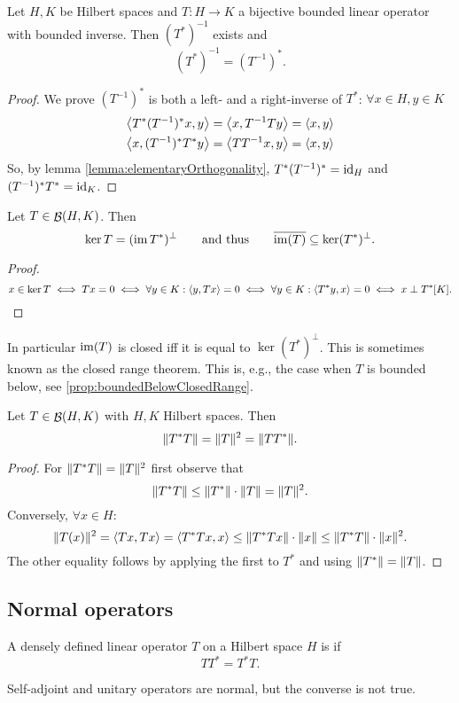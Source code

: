 \begin{proposition}
Let $H,K$ be Hilbert spaces and $T:H\to K$ a bijective bounded linear operator with bounded inverse. Then $(T^*)^{-1}$ exists and
\[ (T^*)^{-1} = (T^{-1})^*. \]
\end{proposition}
\begin{proof}
We prove $(T^{-1})^*$ is both a left- and a right-inverse of $T^*$: $\forall x\in H, y\in K$
\begin{align*}
\left\langle T^*(T^{-1})^*x,y \right\rangle &= \left\langle x,T^{-1}Ty \right\rangle = \left\langle x,y \right\rangle \\
\left\langle x,(T^{-1})^*T^*y \right\rangle &= \left\langle TT^{-1}x,y \right\rangle = \left\langle x,y \right\rangle
\end{align*}
So, by lemma \ref{lemma:elementaryOrthogonality}, $T^*(T^{-1})^* = \operatorname{id}_H$ and $(T^{-1})^*T^* = \operatorname{id}_K$.
\end{proof}

\begin{proposition}
Let $T\in\mathop{\mathcal{B}}(H,K)$. Then
\[ \ker T = (\operatorname{im} T^*)^\perp \qquad \text{and thus} \qquad \overline{\operatorname{im}(T)} \subseteq \ker(T^*)^\perp. \]
\end{proposition}
\begin{proof}
\[ x\in \ker T \iff Tx = 0 \iff \forall y\in K: \left\langle y, Tx \right\rangle=0 \iff \forall y\in K: \left\langle T^*y, x \right\rangle=0 \iff x\perp T^*[K]. \]
\end{proof}
In particular $\operatorname{im}(T)$ is closed iff it is equal to $\ker(T^*)^\perp$. This is sometimes known as the closed range theorem. This is, e.g., the case when $T$ is bounded below, see \ref{prop:boundedBelowClosedRange}.

\begin{proposition} \label{prop:normOfSquare}
Let $T\in \mathop{\mathcal{B}}(H,K)$ with $H,K$ Hilbert spaces. Then
\[ \lVert T^*T\rVert= \lVert T\rVert^2 = \lVert TT^*\rVert. \]
\end{proposition}
\begin{proof}
For $\lVert T^*T\rVert= \lVert T\rVert^2$ first observe that
\[ \lVert T^*T\rVert \leq \lVert T^*\rVert\cdot\lVert T\rVert = \lVert T\rVert^2. \]
Conversely, $\forall x\in H$:
\[ \lVert T(x)\rVert^2 = \left\langle Tx,Tx \right\rangle = \left\langle T^*Tx,x \right\rangle \leq \lVert T^*Tx\rVert\cdot \lVert x\rVert \leq \lVert T^*T\rVert\cdot\lVert x\rVert^2. \]
The other equality follows by applying the first to $T^*$ and using $\lVert T^*\rVert=\lVert T\rVert$.
\end{proof}

\subsection{Normal operators}
\begin{definition}
A densely defined linear operator $T$ on a Hilbert space $H$ is  if
\[ TT^* = T^*T. \]
\end{definition}
Self-adjoint and unitary operators are normal, but the converse is not true.

